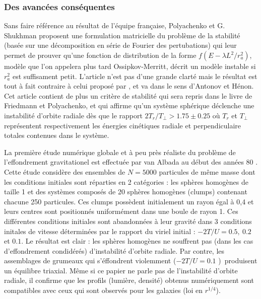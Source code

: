 \subsubsection{Des avancées conséquentes\label{ROIadvances}}

Sans faire r\'{e}f\'{e}rence au r\'{e}sultat de l'équipe française, Polyachenko et
G. Shukhman \cite{polyach} proposent une formulation matricielle du probl\`{e}me de
la stabilit\'{e} (bas\'{e}e sur une d\'{e}composition en s\'{e}rie de Fourier
des pertubations) qui leur permet de prouver qu'une fonction de distribution
de la forme $f\left(  E-\lambda L^{2}/r_{a}^{2}\right)$, mod\`{e}le que l'on appelera plus tard
Ossipkov-Merritt, d\'{e}crit un mod\`{e}le instable si $r_{a}^{2}$ est
suffisament petit. L'article n'est pas d'une grande clart\'{e} mais le
r\'{e}sultat est tout \`{a} fait contraire \`{a} celui propos\'{e} par
\cite{waterbag}, et va dans le sens d'Antonov et H\'{e}non. Cet article contient de
plus un crit\`{e}re de stabilit\'{e} qui sera repris dans le livre de
Friedmann et Polyachenko, et qui affirme qu'un syst\`{e}me sph\'{e}rique
d\'{e}clenche une instabilit\'{e} d'orbite radiale d\`{e}s que le rapport
$2T_{r}/T_{\perp}>1.75\pm0.25$ o\`{u} $T_{r}$ et $T_{\perp}$
repr\'{e}sentent respectivement les \'{e}nergies cin\'{e}tiques radiale et
perpendiculaire totales contenues dans le syst\`{e}me.

La premi\`{e}re \'{e}tude num\'{e}rique globale et à peu près réaliste du probl\`{e}me de
l'effondrement gravitationel est effectu\'{e}e par van Albada au d\'{e}but des
ann\'{e}es 80 \cite{albada}. Cette \'{e}tude consid\`{e}re des ensembles de
$N=5000$ particules de m\^{e}me masse dont les conditions initiales sont r\'{e}parties en 2 cat\'{e}gories : les sph\`{e}res homog\`{e}nes de taille 1
et des syst\`{e}mes compos\'{e}s de 20 sph\`{e}res homog\`{e}nes (clumps)
contenant chacune 250 particules. Ces clumps poss\`{e}dent initialement un
rayon \'{e}gal \`{a} 0,4 et leurs centres sont positionn\'{e}s
uniform\'{e}ment dans une boule de rayon 1$.$ Ces diff\'{e}rentes conditions
initiales sont abandonn\'{e}es \`{a} leur gravit\'{e} dans 3 conditions
initales de vitesse d\'{e}termin\'{e}es par le rapport du viriel initial :
$-2T/U=0.5,~0.2$ et $0.1$. Le r\'{e}sultat est clair : les sph\`{e}res
homog\`{e}nes ne souffrent pas (dans les cas d'effondrement
condid\'{e}r\'{e}s) d'instabilit\'{e} d'orbite radiale. Par contre, les
assemblages de grumeaux qui s'\'{e}ffondrent violemment ($-2T/U=0.1$%
)~produisent un \'{e}quilibre triaxial. M\^{e}me si ce papier ne parle pas de
l'instabilit\'{e} d'orbite radiale, il confirme que les profils (lumi\`{e}re,
densit\'{e}) obtenus num\'{e}riquement sont compatibles avec ceux qui sont
observ\'{e}s pour les galaxies (loi en $r^{1/4}$).


